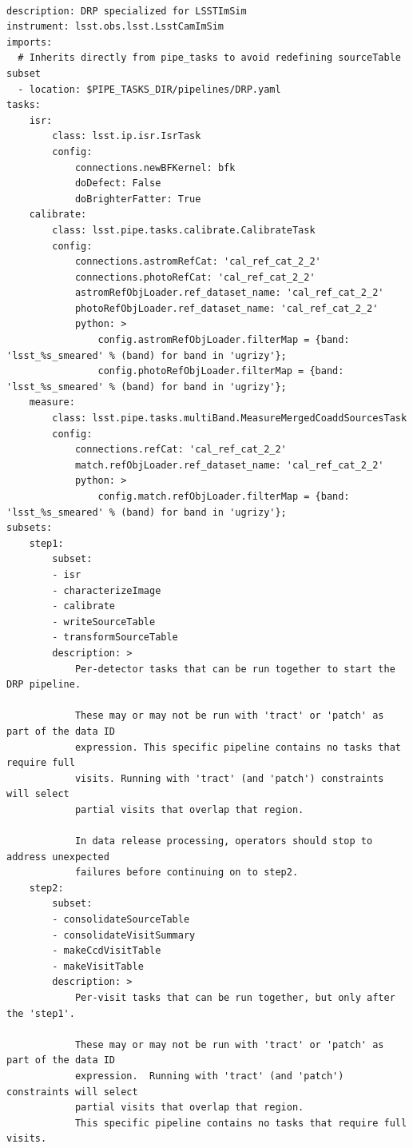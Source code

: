 \documentclass[DM,authoryear,toc]{lsstdoc}
\begin{document}
\begin{verbatim}

description: DRP specialized for LSSTImSim
instrument: lsst.obs.lsst.LsstCamImSim
imports:
  # Inherits directly from pipe_tasks to avoid redefining sourceTable subset
  - location: $PIPE_TASKS_DIR/pipelines/DRP.yaml
tasks:
    isr:
        class: lsst.ip.isr.IsrTask
        config:
            connections.newBFKernel: bfk
            doDefect: False
            doBrighterFatter: True
    calibrate:
        class: lsst.pipe.tasks.calibrate.CalibrateTask
        config:
            connections.astromRefCat: 'cal_ref_cat_2_2'
            connections.photoRefCat: 'cal_ref_cat_2_2'
            astromRefObjLoader.ref_dataset_name: 'cal_ref_cat_2_2'
            photoRefObjLoader.ref_dataset_name: 'cal_ref_cat_2_2'
            python: >
                config.astromRefObjLoader.filterMap = {band: 'lsst_%s_smeared' % (band) for band in 'ugrizy'};
                config.photoRefObjLoader.filterMap = {band: 'lsst_%s_smeared' % (band) for band in 'ugrizy'};
    measure:
        class: lsst.pipe.tasks.multiBand.MeasureMergedCoaddSourcesTask
        config:
            connections.refCat: 'cal_ref_cat_2_2'
            match.refObjLoader.ref_dataset_name: 'cal_ref_cat_2_2'
            python: >
                config.match.refObjLoader.filterMap = {band: 'lsst_%s_smeared' % (band) for band in 'ugrizy'};
subsets:
    step1:
        subset:
        - isr
        - characterizeImage
        - calibrate
        - writeSourceTable
        - transformSourceTable
        description: >
            Per-detector tasks that can be run together to start the DRP pipeline.

            These may or may not be run with 'tract' or 'patch' as part of the data ID
            expression. This specific pipeline contains no tasks that require full
            visits. Running with 'tract' (and 'patch') constraints will select
            partial visits that overlap that region.

            In data release processing, operators should stop to address unexpected
            failures before continuing on to step2.
    step2:
        subset:
        - consolidateSourceTable
        - consolidateVisitSummary
        - makeCcdVisitTable
        - makeVisitTable
        description: >
            Per-visit tasks that can be run together, but only after the 'step1'.

            These may or may not be run with 'tract' or 'patch' as part of the data ID
            expression.  Running with 'tract' (and 'patch') constraints will select
            partial visits that overlap that region.
            This specific pipeline contains no tasks that require full visits.


\end{verbatim}
\end{document}

